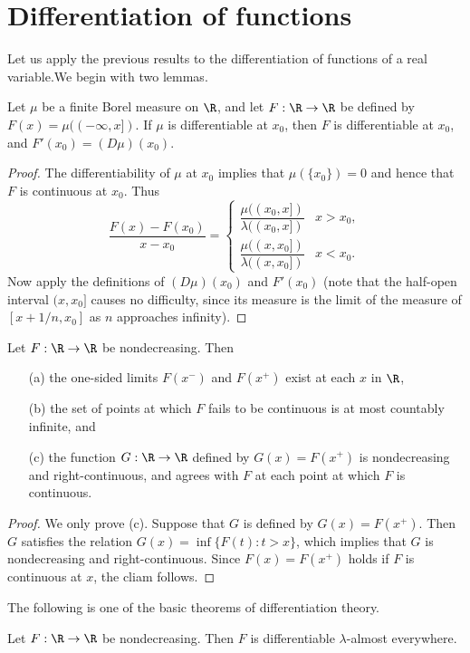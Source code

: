 \section{Differentiation of functions}
Let us apply the previous results to the differentiation of functions of a real variable.We begin with two lemmas.
\begin{lemma}\label{measure function derivative}
Let $\mu$ be a finite Borel measure on $\R$, and let $F:\R\to\R$ be defined by $F(x)=\mu((-\infty,x])$. If $\mu$ is differentiable at $x_0$, then $F$ is differentiable at $x_0$, and $F'(x_0)=(D\mu)(x_0)$.
\end{lemma}
\begin{proof}
The differentiability of $\mu$ at $x_0$ implies that $\mu(\{x_0\})=0$ and hence that $F$ is continuous at $x_0$. Thus 
\[\frac{F(x)-F(x_0)}{x-x_0}=\begin{cases}
\dfrac{\mu((x_0,x])}{\lambda((x_0,x])}&x>x_0,\\[10pt]
\dfrac{\mu((x,x_0])}{\lambda((x,x_0])}&x<x_0.
\end{cases}\]
Now apply the definitions of $(D\mu)(x_0)$ and $F'(x_0)$ (note that the half-open interval $(x,x_0]$ causes no difficulty, since its measure is the limit of the measure of $[x+1/n,x_0]$ as $n$ approaches infinity).
\end{proof}
\begin{lemma}\label{increasing function continuous point}
Let $F:\R\to\R$ be nondecreasing. Then
\begin{itemize}
\item[(a)] the one-sided limits $F(x^-)$ and $F(x^+)$ exist at each $x$ in $\R$,
\item[(b)] the set of points at which $F$ fails to be continuous is at most countably infinite, and
\item[(c)] the function $G:\R\to\R$ defined by $G(x)=F(x^+)$ is nondecreasing and right-continuous, and agrees with $F$ at each point at which $F$ is continuous.
\end{itemize}
\end{lemma}
\begin{proof}
We only prove (c). Suppose that $G$ is defined by $G(x)=F(x^+)$. Then $G$ satisfies the relation $G(x)=\inf\{F(t):t>x\}$, which implies that $G$ is nondecreasing and right-continuous. Since $F(x)=F(x^+)$ holds if $F$ is continuous at $x$, the cliam follows.
\end{proof}
The following is one of the basic theorems of differentiation theory.
\begin{theorem}\label{increasing function a.e. diff}
Let $F:\R\to\R$ be nondecreasing. Then $F$ is differentiable $\lambda$-almost everywhere.
\end{theorem}

